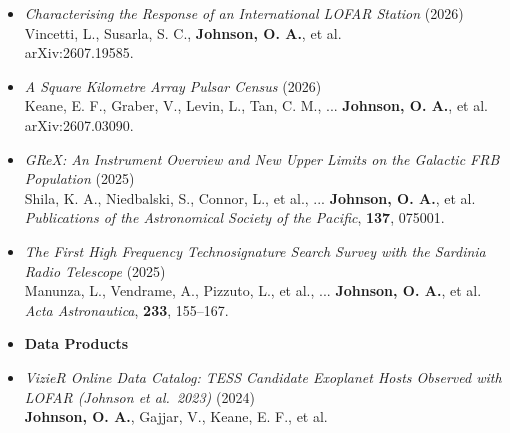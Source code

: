 \begin{itemize}
    \item[] \textit{Characterising the Response of an International LOFAR Station} (2026)\\
    Vincetti, L., Susarla, S. C., \textbf{Johnson, O. A.}, et al.\\
    arXiv:2607.19585.


    \item[] \textit{A Square Kilometre Array Pulsar Census} (2026)\\
    Keane, E. F., Graber, V., Levin, L., Tan, C. M., ... \textbf{Johnson, O. A.}, et al.\\
    arXiv:2607.03090.

    \item[] \textit{GReX: An Instrument Overview and New Upper Limits on the Galactic FRB Population} (2025)\\
    Shila, K. A., Niedbalski, S., Connor, L., et al., ... \textbf{Johnson, O. A.}, et al.\\
    \textit{Publications of the Astronomical Society of the Pacific}, \textbf{137}, 075001.

    \item[] \textit{The First High Frequency Technosignature Search Survey with the Sardinia Radio Telescope} (2025)\\
    Manunza, L., Vendrame, A., Pizzuto, L., et al., ... \textbf{Johnson, O. A.}, et al.\\
    \textit{Acta Astronautica}, \textbf{233}, 155--167.

    \item[] \vspace{0.5em}
    \textbf{Data Products}

    \item[] \textit{VizieR Online Data Catalog: TESS Candidate Exoplanet Hosts Observed with LOFAR (Johnson et al.\ 2023)} (2024)\\
    \textbf{Johnson, O. A.}, Gajjar, V., Keane, E. F., et al.

\end{itemize}